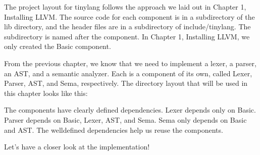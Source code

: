 The project layout for tinylang follows the approach we laid out in Chapter 1, Installing LLVM.
The source code for each component is in a subdirectory of the lib directory, and the header files are in a subdirectory of include/tinylang. The subdirectory is named after the component. In Chapter 1, Installing LLVM, we only created the Basic component.

From the previous chapter, we know that we need to implement a lexer, a parser, an AST, and a semantic analyzer. Each is a component of its own, called Lexer, Parser, AST, and Sema, respectively. The directory layout that will be used in this chapter looks like this:


The components have clearly defined dependencies. Lexer depends only on Basic. Parser depends on Basic, Lexer, AST, and Sema. Sema only depends on Basic and AST. The welldefined dependencies help us reuse the components.

Let’s have a closer look at the implementation!